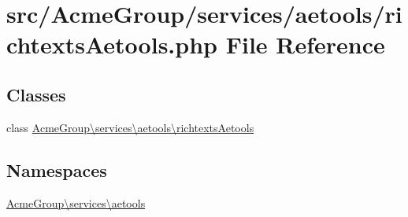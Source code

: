 \hypertarget{richtexts_aetools_8php}{\section{src/\+Acme\+Group/services/aetools/richtexts\+Aetools.php File Reference}
\label{richtexts_aetools_8php}
}
\subsection*{Classes}
\begin{DoxyCompactItemize}
\item 
class \hyperlink{class_acme_group_1_1services_1_1aetools_1_1richtexts_aetools}{Acme\+Group\textbackslash{}services\textbackslash{}aetools\textbackslash{}richtexts\+Aetools}
\end{DoxyCompactItemize}
\subsection*{Namespaces}
\begin{DoxyCompactItemize}
\item 
 \hyperlink{namespace_acme_group_1_1services_1_1aetools}{Acme\+Group\textbackslash{}services\textbackslash{}aetools}
\end{DoxyCompactItemize}
